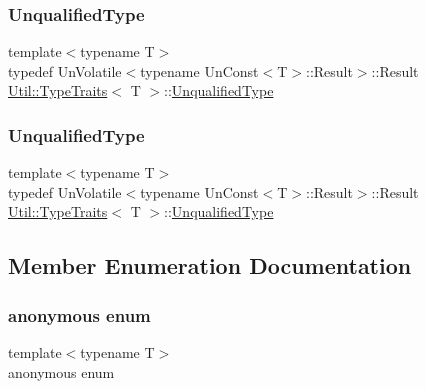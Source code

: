 \mbox{\label{classUtil_1_1TypeTraits_a9d25b7cafbc7acafa3275b5fe5a04ee0}} 
\subsubsection{\texorpdfstring{UnqualifiedType}{UnqualifiedType}\hspace{0.1cm}{\footnotesize\ttfamily [2/3]}}
{\footnotesize\ttfamily template$<$typename T$>$ \\
typedef Un\+Volatile$<$typename Un\+Const$<$T$>$\+::Result$>$\+::Result \mbox{\hyperlink{classUtil_1_1TypeTraits}{Util\+::\+Type\+Traits}}$<$ T $>$\+::\mbox{\hyperlink{classUtil_1_1TypeTraits_a9d25b7cafbc7acafa3275b5fe5a04ee0}{Unqualified\+Type}}}

\mbox{\label{classUtil_1_1TypeTraits_a9d25b7cafbc7acafa3275b5fe5a04ee0}} 
\subsubsection{\texorpdfstring{UnqualifiedType}{UnqualifiedType}\hspace{0.1cm}{\footnotesize\ttfamily [3/3]}}
{\footnotesize\ttfamily template$<$typename T$>$ \\
typedef Un\+Volatile$<$typename Un\+Const$<$T$>$\+::Result$>$\+::Result \mbox{\hyperlink{classUtil_1_1TypeTraits}{Util\+::\+Type\+Traits}}$<$ T $>$\+::\mbox{\hyperlink{classUtil_1_1TypeTraits_a9d25b7cafbc7acafa3275b5fe5a04ee0}{Unqualified\+Type}}}



\subsection{Member Enumeration Documentation}
\mbox{\label{classUtil_1_1TypeTraits_a72511c3895a8d772113e5ba68b4214d5}} 
\subsubsection{\texorpdfstring{anonymous enum}{anonymous enum}}
{\footnotesize\ttfamily template$<$typename T$>$ \\
anonymous enum}

